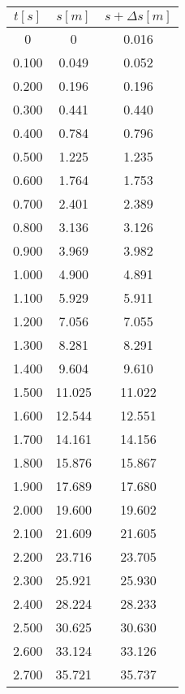 \documentclass[a4paper,12pt]{article}
\begin{document}
\begin{table}[b]
\centering
\begin{tabular}{|c|c|c|}
        \hline
        $t[s]$ & $s[m]$ & $s+\Delta s[m]$ \\
        \hline
             0&     0&  0.016\\
        \hline
        0.100&	0.049&	0.052\\
        \hline
        0.200&	0.196&	0.196\\
        \hline
        0.300&	0.441&	0.440\\
        \hline
        0.400&	0.784&	0.796\\
        \hline
        0.500&	1.225&	1.235\\
        \hline
        0.600&	1.764&	1.753\\
        \hline
        0.700&	2.401&	2.389\\
        \hline
        0.800&	3.136&	3.126\\
        \hline
        0.900&	3.969&	3.982\\
        \hline
        1.000&	4.900&	4.891\\
        \hline
        1.100&	5.929&	5.911\\
        \hline
        1.200&	7.056&	7.055\\
        \hline
        1.300&	8.281&	8.291\\
        \hline
        1.400&	9.604&	9.610\\
        \hline
        1.500&	11.025&	11.022\\
        \hline
        1.600&	12.544&	12.551\\
        \hline
        1.700&	14.161&	14.156\\
        \hline
        1.800&	15.876&	15.867\\
        \hline
        1.900&	17.689&	17.680\\
        \hline
        2.000&	19.600&	19.602\\
        \hline
        2.100&	21.609&	21.605\\
        \hline
        2.200&	23.716&	23.705\\
        \hline
        2.300&	25.921&	25.930\\
        \hline
        2.400&	28.224&	28.233\\
        \hline
        2.500&	30.625&	30.630\\
        \hline
        2.600&	33.124&	33.126\\
        \hline
        2.700&	35.721&	35.737\\

\end{tabular}
\end{table}
\end{document}
